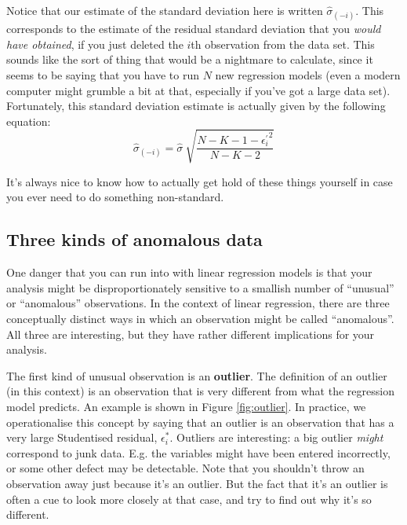 \documentclass[
]{book}
\theoremstyle{definition}
\theoremstyle{definition}
\theoremstyle{definition}
\theoremstyle{definition}
\theoremstyle{remark}
\begin{document}
Notice that our estimate of the standard deviation here is written \(\hat{\sigma}_{(-i)}\). This corresponds to the estimate of the residual standard deviation that you \emph{would have obtained}, if you just deleted the \(i\)th observation from the data set. This sounds like the sort of thing that would be a nightmare to calculate, since it seems to be saying that you have to run \(N\) new regression models (even a modern computer might grumble a bit at that, especially if you've got a large data set). Fortunately, this standard deviation estimate is actually given by the following equation:
\[
\hat\sigma_{(-i)} = \hat{\sigma} \ \sqrt{\frac{N-K-1 - {\epsilon_{i}^\prime}^2}{N-K-2}}
\]

It's always nice to know how to actually get hold of these things yourself in case you ever need to do something non-standard.

\hypertarget{regressionoutliers}{%
\subsection{Three kinds of anomalous data}\label{regressionoutliers}}

One danger that you can run into with linear regression models is that your analysis might be disproportionately sensitive to a smallish number of ``unusual'' or ``anomalous'' observations. In the context of linear regression, there are three conceptually distinct ways in which an observation might be called ``anomalous''. All three are interesting, but they have rather different implications for your analysis.

The first kind of unusual observation is an \textbf{outlier}. The definition of an outlier (in this context) is an observation that is very different from what the regression model predicts. An example is shown in Figure \ref{fig:outlier}. In practice, we operationalise this concept by saying that an outlier is an observation that has a very large Studentised residual, \(\epsilon_i^*\). Outliers are interesting: a big outlier \emph{might} correspond to junk data. E.g. the variables might have been entered incorrectly, or some other defect may be detectable. Note that you shouldn't throw an observation away just because it's an outlier. But the fact that it's an outlier is often a cue to look more closely at that case, and try to find out why it's so different.
\end{document}

